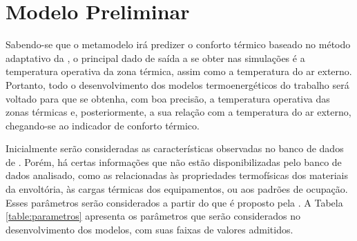 \documentclass[brazil,hardcopy,openany,a5paper]{ufscthesis}
\begin{document}
		\section{Modelo Preliminar}
		
		Sabendo-se que o metamodelo irá predizer o conforto térmico baseado no método adaptativo da  \cite{ASHRAEStandard552017}, o principal dado de saída a se obter nas simulações é a temperatura operativa da zona térmica, assim como a temperatura do ar externo. Portanto, todo o desenvolvimento dos modelos termoenergéticos do trabalho será voltado para que se obtenha, com boa precisão, a temperatura operativa das zonas térmicas e, posteriormente, a sua relação com a temperatura do ar externo, chegando-se ao indicador de conforto térmico.
		
		Inicialmente serão consideradas as características observadas no banco de dados de  \cite{Pereira2018}. Porém, há certas informações que não estão disponibilizadas pelo banco de dados analisado, como as relacionadas às propriedades termofísicas dos materiais da envoltória, às cargas térmicas dos equipamentos, ou aos padrões de ocupação. Esses parâmetros serão considerados a partir do que é proposto pela  \cite{INIC}. A Tabela \ref{table:parametros} apresenta os parâmetros que serão considerados no desenvolvimento dos modelos, com suas faixas de valores admitidos.	
		
\end{document}

